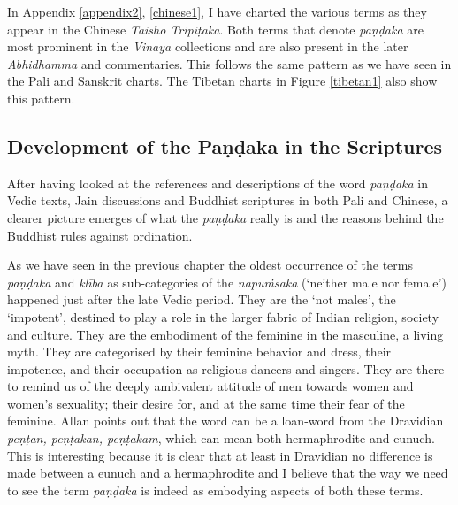 In Appendix \ref{appendix2}, \ref{chinese1}, I have charted the various terms as they appear in the Chinese \textit{Taishō Tripiṭaka}. Both terms that denote \textit{paṇḍaka} are most prominent in the \textit{Vinaya} collections and are also present in the later \textit{Abhidhamma} and commentaries. This follows the same pattern as we have seen in the Pali and Sanskrit charts. The Tibetan charts in Figure \ref{tibetan1} also show this pattern.

\subsection{Development of the Paṇḍaka in the Scriptures}
After having looked at the references and descriptions of the word \textit{paṇḍaka} in Vedic texts, Jain discussions and Buddhist scriptures in both Pali and Chinese, a clearer picture emerges of what the \textit{paṇḍaka} really is and the reasons behind the Buddhist rules against ordination.

As we have seen in the previous chapter the oldest occurrence of the terms \textit{paṇḍaka} and \textit{klība} as sub-categories of the \textit{napuṁsaka} (`neither male nor female') happened just after the late Vedic period. They are the `not males', the `impotent', destined to play a role in the larger fabric of Indian religion, society and culture. They are the embodiment of the feminine in the masculine, a living myth. They are categorised by their feminine behavior and dress, their impotence, and their occupation as religious dancers and singers. They are there to remind us of the deeply ambivalent attitude of men towards women and women's sexuality; their desire for, and at the same time their fear of the feminine. Allan \cite{bomhard} points out that the word can be a loan-word from the Dravidian \textit{peṇṭan, peṇṭakan, peṇṭakam}, which can mean both hermaphrodite and eunuch. This is interesting because it is clear that at least in Dravidian no difference is made between a eunuch and a hermaphrodite and I believe that the way we need to see the term \textit{paṇḍaka} is indeed as embodying aspects of both these terms.

